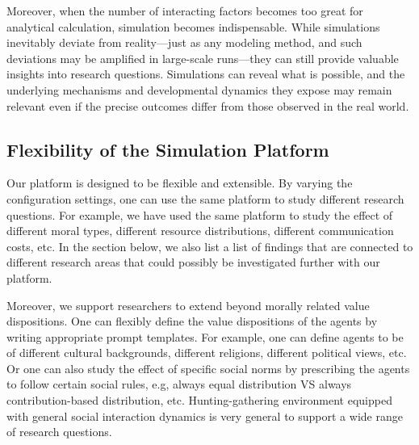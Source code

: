 Moreover, when the number of interacting factors becomes too great for analytical calculation, simulation becomes indispensable. While simulations inevitably deviate from reality—just as any modeling method, and such deviations may be amplified in large-scale runs—they can still provide valuable insights into research questions. Simulations can reveal what is possible, and the underlying mechanisms and developmental dynamics they expose may remain relevant even if the precise outcomes differ from those observed in the real world.

\subsection{Flexibility of the Simulation Platform}
Our platform is designed to be flexible and extensible. By varying the configuration settings, one can use the same platform to study different research questions. For example, we have used the same platform to study the effect of different moral types, different resource distributions, different communication costs, etc. In the section below, we also list a list of findings that are connected to different research areas that could possibly be investigated further with our platform.

Moreover, we support researchers to extend beyond morally related value dispositions. One can flexibly define the value dispositions of the agents by writing appropriate prompt templates. For example, one can define agents to be of different cultural backgrounds, different religions, different political views, etc. Or one can also study the effect of specific social norms by prescribing the agents to follow certain social rules, e.g, always equal distribution VS always contribution-based distribution, etc. Hunting-gathering environment equipped with general social interaction dynamics is very general to support a wide range of research questions.